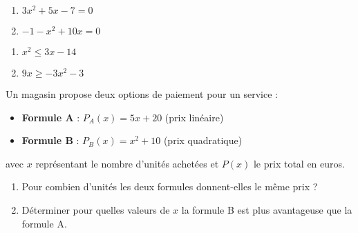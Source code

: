 \documentclass[11pt]{article}
\begin{document}
\phantom{0}
\vspace{-1.5cm}

\begin{center}
\recherche 
{}
\end{center}

\begin{exercicedevoir}
\begin{enumerate}
\item $3x^2+5x-7=0$
\item $-1-x^2+10x=0$
\end{enumerate}
\end{exercicedevoir}

\begin{exercicedevoir}
\begin{enumerate}
\item $x^2 \leq 3x-14$
\item $9x \geq -3x^2-3$
\end{enumerate}
\end{exercicedevoir}

\begin{exercicedevoir}

Un magasin propose deux options de paiement pour un service :

\begin{itemize}
    \item \textbf{Formule A} : $P_A(x) = 5x + 20$ (prix linéaire)
    \item \textbf{Formule B} : $P_B(x) = x^2 + 10$ (prix quadratique)
\end{itemize}

avec $x$ représentant le nombre d'unités achetées et $P(x)$ le prix total en euros.

\begin{enumerate}
    \item Pour combien d'unités les deux formules donnent-elles le même prix ?
    \item Déterminer pour quelles valeurs de $x$ la formule B est plus avantageuse que la formule A.
\end{enumerate}
\end{exercicedevoir}
\end{document}
